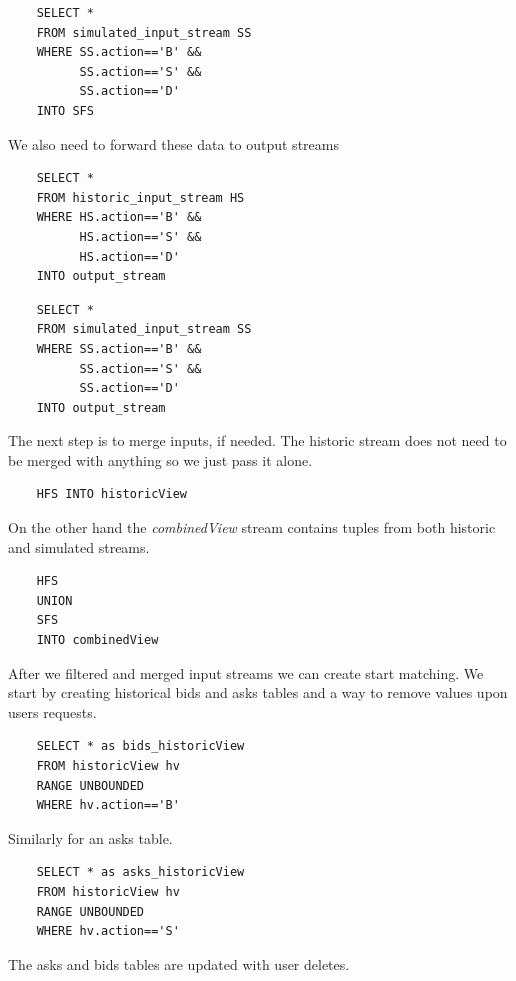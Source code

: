 \documentclass{article}
\begin{document}
\begin{verbatim}  
    SELECT *
    FROM simulated_input_stream SS
    WHERE SS.action=='B' &&
          SS.action=='S' &&
          SS.action=='D'
    INTO SFS
\end{verbatim}

\noindent We also need to forward these data to output streams

\begin{verbatim}   
    SELECT * 
    FROM historic_input_stream HS
    WHERE HS.action=='B' &&
          HS.action=='S' &&
          HS.action=='D'
    INTO output_stream
\end{verbatim}

\begin{verbatim}  
    SELECT *
    FROM simulated_input_stream SS
    WHERE SS.action=='B' &&
          SS.action=='S' &&
          SS.action=='D'
    INTO output_stream
\end{verbatim}

\noindent The next step is to merge inputs, if needed. The historic stream does not need to be merged with anything so we just pass it alone. 

\begin{verbatim} 
    HFS INTO historicView
\end{verbatim}

\noindent On the other hand the \emph{combinedView} stream contains tuples from both historic and simulated streams. 

\begin{verbatim}  
    HFS
    UNION
    SFS
    INTO combinedView
\end{verbatim}

\noindent After we filtered and merged input streams we can create start matching. We start by creating historical bids and asks tables and a way to remove values upon users requests. 

\begin{verbatim}  
    SELECT * as bids_historicView
    FROM historicView hv
    RANGE UNBOUNDED
    WHERE hv.action=='B'
\end{verbatim}

\noindent Similarly for an asks table.

\begin{verbatim}  
    SELECT * as asks_historicView
    FROM historicView hv
    RANGE UNBOUNDED
    WHERE hv.action=='S'
\end{verbatim}

\noindent The asks and bids tables are updated with user deletes.
\end{document}
